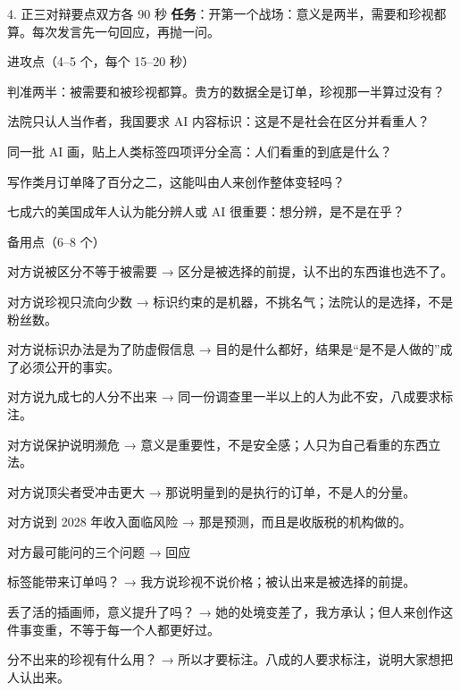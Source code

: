 \documentclass[script,pro]{debate}
\begin{document}
\begin{stage}{4. 正三对辩要点}{双方各 90 秒}
\textbf{任务}：开第一个战场：意义是两半，需要和珍视都算。每次发言先一句回应，再抛一问。
\begin{points}{进攻点（4–5 个，每个 15–20 秒）}
\item 判准两半：被需要和被珍视都算。贵方的数据全是订单，珍视那一半算过没有？
\item 法院只认人当作者，我国要求 AI 内容标识：这是不是社会在区分并看重人？
\item 同一批 AI 画，贴上人类标签四项评分全高：人们看重的到底是什么？
\item 写作类月订单降了百分之二，这能叫由人来创作整体变轻吗？
\item 七成六的美国成年人认为能分辨人或 AI 很重要：想分辨，是不是在乎？
\end{points}
\begin{points}{备用点（6–8 个）}
\item 对方说被区分不等于被需要 → 区分是被选择的前提，认不出的东西谁也选不了。
\item 对方说珍视只流向少数 → 标识约束的是机器，不挑名气；法院认的是选择，不是粉丝数。
\item 对方说标识办法是为了防虚假信息 → 目的是什么都好，结果是“是不是人做的”成了必须公开的事实。
\item 对方说九成七的人分不出来 → 同一份调查里一半以上的人为此不安，八成要求标注。
\item 对方说保护说明濒危 → 意义是重要性，不是安全感；人只为自己看重的东西立法。
\item 对方说顶尖者受冲击更大 → 那说明量到的是执行的订单，不是人的分量。
\item 对方说到 2028 年收入面临风险 → 那是预测，而且是收版税的机构做的。
\end{points}
\begin{points}{对方最可能问的三个问题 → 回应}
\item 标签能带来订单吗？ → 我方说珍视不说价格；被认出来是被选择的前提。
\item 丢了活的插画师，意义提升了吗？ → 她的处境变差了，我方承认；但人来创作这件事变重，不等于每一个人都更好过。
\item 分不出来的珍视有什么用？ → 所以才要标注。八成的人要求标注，说明大家想把人认出来。
\end{points}
\end{stage}
\end{document}

